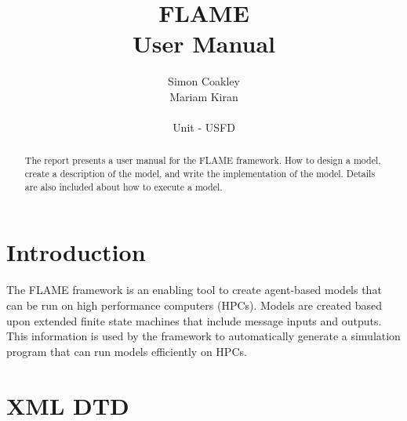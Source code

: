 \documentclass[12pt,a4paper]{article}
\begin{document}
\title{FLAME
\\User Manual}
\author{Simon Coakley\\Mariam Kiran
\\
\\ Unit - USFD}

\maketitle



\begin{abstract}
The report presents a user manual for the FLAME framework. How to design a
model, create a description of the model, and write the implementation of the model.
Details are also included about how to execute a model.
\end{abstract}

\pagebreak
\tableofcontents
\pagebreak

\section{Introduction}

The FLAME framework is an enabling tool to create agent-based models that can
be run on high performance computers (HPCs). Models are created based upon
extended finite state machines that include message inputs and outputs. This information
is used by the framework to automatically generate a simulation program that
can run models efficiently on HPCs.






\appendix

\section{XML DTD}                       %
\label{cha_xmldtd}

\small{{\tt }}


%
%
\end{document}
